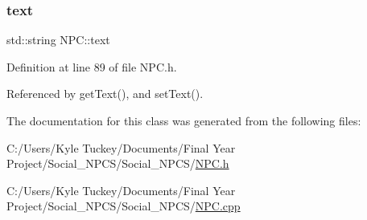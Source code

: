 \subsubsection{\texorpdfstring{text}{text}}
{\footnotesize\ttfamily std\+::string N\+P\+C\+::text\hspace{0.3cm}{\ttfamily [private]}}



Definition at line 89 of file N\+P\+C.\+h.



Referenced by get\+Text(), and set\+Text().



The documentation for this class was generated from the following files\+:\begin{DoxyCompactItemize}
\item 
C\+:/\+Users/\+Kyle Tuckey/\+Documents/\+Final Year Project/\+Social\+\_\+\+N\+P\+C\+S/\+Social\+\_\+\+N\+P\+C\+S/\hyperlink{_n_p_c_8h}{N\+P\+C.\+h}\item 
C\+:/\+Users/\+Kyle Tuckey/\+Documents/\+Final Year Project/\+Social\+\_\+\+N\+P\+C\+S/\+Social\+\_\+\+N\+P\+C\+S/\hyperlink{_n_p_c_8cpp}{N\+P\+C.\+cpp}\end{DoxyCompactItemize}
